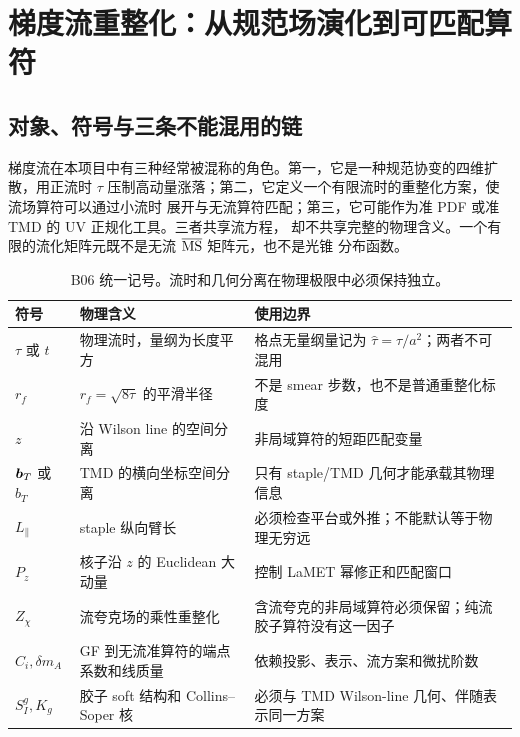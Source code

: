 \chapter{梯度流重整化：从规范场演化到可匹配算符}
\label{sec:b06-flow-renormalization}

\section{对象、符号与三条不能混用的链}

梯度流在本项目中有三种经常被混称的角色。第一，它是一种规范协变的四维扩散，用正流时
\(\tau\) 压制高动量涨落；第二，它定义一个有限流时的重整化方案，使流场算符可以通过小流时
展开与无流算符匹配；第三，它可能作为准 PDF 或准 TMD 的 UV 正规化工具。三者共享流方程，
却不共享完整的物理含义。一个有限的流化矩阵元既不是无流 \(\overline{\mathrm{MS}}\) 矩阵元，也不是光锥
分布函数。

\begin{table}[htbp]
\centering
\caption{B06 统一记号。流时和几何分离在物理极限中必须保持独立。}
\label{tab:b06-symbols}
\small
\begin{tabularx}{\textwidth}{@{}p{}p{}X@{}}
\toprule
符号 & 物理含义 & 使用边界 \\
\midrule
\(\tau\) 或 \(t\) & 物理流时，量纲为长度平方 & 格点无量纲量记为 \(\widehat\tau=\tau/a^2\)；两者不可混用 \\
\(r_f\) & \(r_f=\sqrt{8\tau}\) 的平滑半径 & 不是 smear 步数，也不是普通重整化标度 \\
\(z\) & 沿 Wilson line 的空间分离 & 非局域算符的短距匹配变量 \\
\(\boldsymbol b_T\) 或 \(b_T\) & TMD 的横向坐标空间分离 & 只有 staple/TMD 几何才能承载其物理信息 \\
\(L_\parallel\) & staple 纵向臂长 & 必须检查平台或外推；不能默认等于物理无穷远 \\
\(P_z\) & 核子沿 \(z\) 的 Euclidean 大动量 & 控制 LaMET 幂修正和匹配窗口 \\
\(Z_\chi\) & 流夸克场的乘性重整化 & 含流夸克的非局域算符必须保留；纯流胶子算符没有这一因子 \\
\(C_i,\delta m_A\) & GF 到无流准算符的端点系数和线质量 & 依赖投影、表示、流方案和微扰阶数 \\
\(S_I^g,K_g\) & 胶子 soft 结构和 Collins--Soper 核 & 必须与 TMD Wilson-line 几何、伴随表示同一方案 \\
\bottomrule
\end{tabularx}
\end{table}

